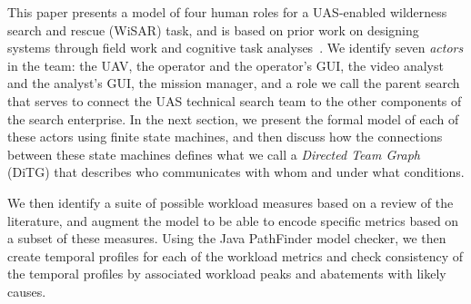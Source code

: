 This paper presents a model of four human roles for a UAS-enabled wilderness search and rescue (WiSAR) task, and is based on prior work on designing systems through field work and cognitive task analyses~\cite{Adams2008,GoodrichMorse2008}.  We identify seven {\em actors} in the team: the UAV, the operator and the operator's GUI, the video analyst and the analyst's GUI, the mission manager, and a role we call the parent search that serves to connect the UAS technical search team to the other components of the search enterprise.  In the next section, we present the formal model of each of these actors using finite state machines, and then discuss how the connections between these state machines defines what we call a {\em Directed Team Graph} (DiTG) that describes who communicates with whom and under what conditions.

We then identify a suite of possible workload measures based on a review of the literature, and augment the model to be able to encode specific metrics based on a subset of these measures.  Using the Java PathFinder model checker, we then create temporal profiles for each of the workload metrics and check consistency of the temporal profiles by associated workload peaks and abatements with likely causes. 

